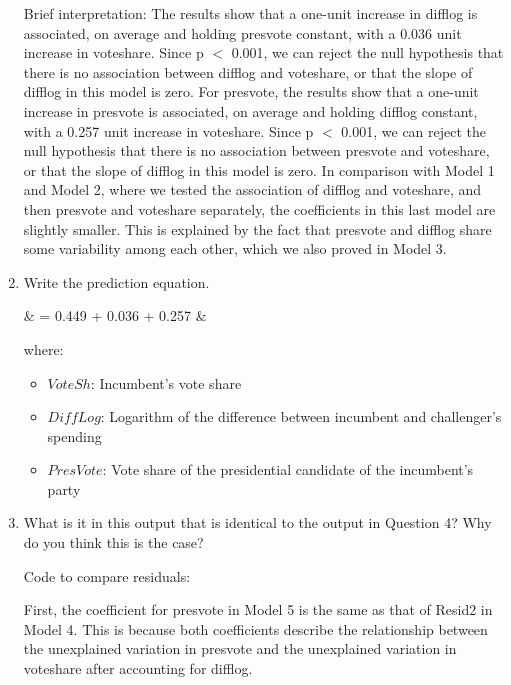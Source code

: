 \documentclass[12pt,letterpaper]{article}
\begin{document}
\begin{enumerate}
		Brief interpretation: 
		The results show that a one-unit increase in difflog is associated, on average and holding presvote constant, with a 0.036 unit increase in voteshare. Since p $<$ 0.001, we can reject the null hypothesis that there is no association between difflog and voteshare, or that the slope of difflog in this model is zero. 
		For presvote, the results show that a one-unit increase in presvote is associated, on average and holding difflog constant, with a 0.257 unit increase in voteshare. Since p $<$ 0.001, we can reject the null hypothesis that there is no association between presvote and voteshare, or that the slope of difflog in this model is zero. 
		In comparison with Model 1 and Model 2, where we tested the association of difflog and voteshare, and then presvote and voteshare separately, the coefficients in this last model are slightly smaller. This is explained by the fact that presvote and difflog share some variability among each other, which we also proved in Model 3. 
		
		\item Write the prediction equation. 
		
		{\setlength{\abovedisplayskip}{2pt} 
			\setlength{\belowdisplayskip}{6pt} 
			
			\begin{flalign*}
				& = 0.449 + 0.036 \cdot {} + 0.257 \cdot {} &
			\end{flalign*}
			
			where: 
			
			\begin{itemize}
				\item $VoteSh$: Incumbent's vote share
				\item $DiffLog$: Logarithm of the difference between incumbent and challenger's spending
				\item $PresVote$: Vote share of the presidential candidate of the incumbent's party
			\end{itemize}
		}
		
		\item What is it in this output that is identical to the output in Question 4? Why do you think this is the case? \vspace{.25cm}
		
		Code to compare residuals: 
		
		
		First, the coefficient for presvote in Model 5 is the same as that of Resid2 in Model 4. This is because both coefficients describe the relationship between the unexplained variation in presvote and the unexplained variation in voteshare after accounting for difflog. 
		

\end{enumerate}
\end{document}
